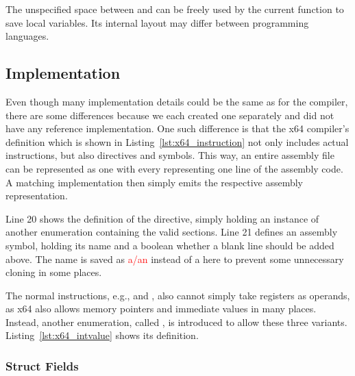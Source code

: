 The unspecified space between  and  can be freely used by the current function to save local variables.
Its internal layout may differ between programming languages.

\subsection{Implementation}


Even though many implementation details could be the same as for the \riscv{} compiler, there are some differences because we each created one separately and did not have any reference implementation.
One such difference is that the x64 compiler's  definition which is shown in Listing~\ref{lst:x64_instruction} not only includes actual instructions, but also directives and symbols.
This way, an entire assembly file can be represented as one  with every  representing one line of the assembly code.
A matching  implementation then simply emits the respective assembly representation.

Line 20 shows the definition of the  directive, simply holding an instance of another enumeration containing the valid sections.
Line 21 defines an assembly symbol, holding its name and a boolean whether a blank line should be added above.
The name is saved as \textcolor{red}{a/an}  instead of a  here to prevent some unnecessary cloning in some places.

The normal instructions, e.g.,  and , also cannot simply take registers as operands, as x64 also allows memory pointers and immediate values in many places.
Instead, another enumeration, called , is introduced to allow these three variants.
Listing~\ref{lst:x64_intvalue} shows its definition.

\subsubsection{Struct Fields}


